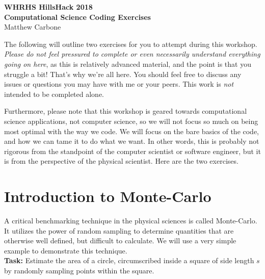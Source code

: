 \documentclass[10pt, letterpaper, twoside]{article}
\begin{document}

\thispagestyle{empty}
\begin{center}
	 		\noindent\textbf{\Large WHRHS HillsHack 2018 \\ Computational
	 		Science Coding Exercises}\\
			{\large Matthew Carbone}\\
\end{center}

\noindent The following will outline two exercises for you to attempt during
this workshop. \emph{Please do not feel pressured to complete or even necessarily
understand everything going on here}, as this is relatively advanced material,
and the point is that you struggle a bit! That's why we're all here. You should
feel free to discuss any issues or questions you may have with me or your
peers. This work is \emph{not} intended to be completed alone.

Furthermore, please note that this workshop is geared towards computational
science applications, not computer science, so we will not focus so much on
being most optimal with the way we code. We will focus on the bare basics of
the code, and how we can tame it to do what we want. In other words, this is
probably not rigorous from the standpoint of the computer scientist or
software engineer, but it is from the perspective of the physical scientist.
Here are the two exercises.

\section{Introduction to Monte-Carlo}
A critical benchmarking technique in the physical sciences is called
Monte-Carlo. It utilizes the power of random sampling to determine quantities
that are otherwise well defined, but difficult to calculate. We will use a very 
simple example to demonstrate this technique.\\

\textbf{Task:} Estimate the area of a circle, circumscribed inside a square of
side length $s$ by randomly sampling points within the square.\\
\end{document}

